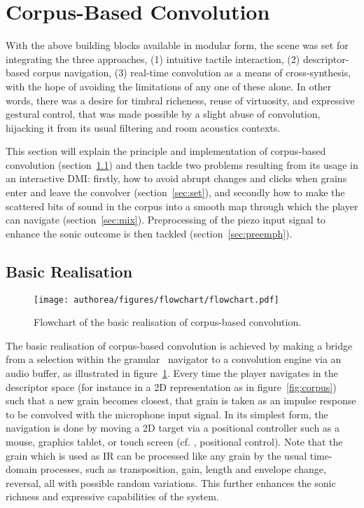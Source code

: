 \section{Corpus-Based Convolution} %

With the above building blocks available in modular form, the scene was set for integrating the three approaches, (1) intuitive tactile interaction, (2) descriptor-based corpus navigation, (3) real-time convolution as a means of cross-\hspace{0pt}synthesis, with the hope of avoiding the limitations of any one of these alone. In other words, there was a desire for timbral richeness, reuse of virtuosity, and expressive gestural control, that was made possible by a slight abuse of convolution, hijacking it from its usual filtering and room acoustics contexts.

This section will explain the principle and implementation of corpus-based convolution (section~\ref{sec:basic}) and then tackle two problems resulting from its usage in an interactive DMI: 
firstly, how to avoid abrupt changes and clicks when grains enter and leave the convolver (section~\ref{sec:set}), and secondly 
how to make the scattered bits of sound in the corpus into a smooth map through which the player can navigate (section~\ref{sec:mix}). Preprocessing of the piezo input signal to enhance the sonic outcome is then tackled (section~\ref{sec:preemph}).

\subsection{Basic Realisation}\label{sec:basic}

\begin{figure}[tb] 
\texttt{[image: authorea/figures/flowchart/flowchart.pdf]} 
\caption{Flowchart of the basic realisation of corpus-based convolution.}
\label{fig:schema} 
\end{figure} 

The basic realisation of corpus-based convolution is achieved by making a bridge from a selection within the granular \cbcs\ navigator to a convolution engine via an audio buffer, as illustrated in figure~\ref{fig:schema}.  Every time the player navigates in the descriptor space (for instance in a 2D representation as in figure~\ref{fig:corpus}) such that a new grain becomes closest, that grain is taken as an impulse response to be convolved with the microphone input signal.  In its simplest form, the navigation is done by moving a 2D target via a positional controller such as a mouse, graphics tablet, or touch screen (cf. \cite{Schwarz-nime2012-sound-space}, positional control).
%
Note that the grain which is used as IR can be processed like any grain by the usual time-domain processes, such as transposition, gain, length and envelope change, reversal, all with possible random variations. This further enhances the sonic richness and expressive capabilities of the system.

